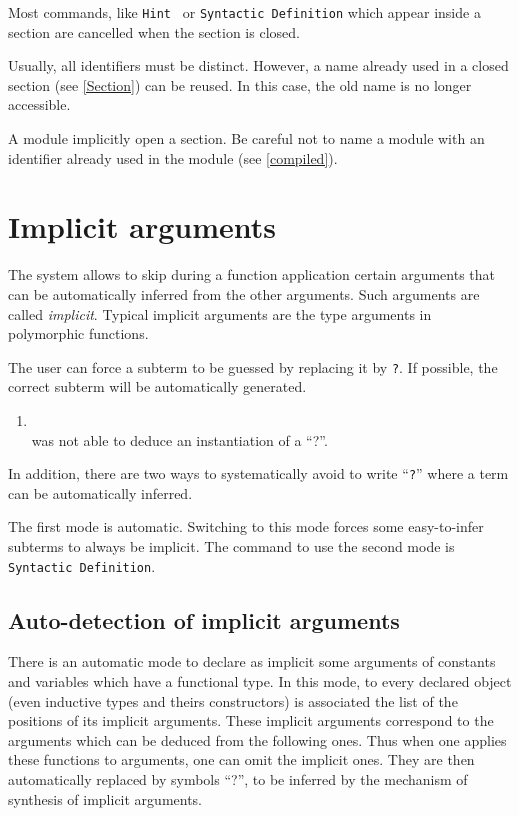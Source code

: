 \begin{Remarks}
\item Most commands, like {\tt Hint \ident} or {\tt Syntactic
  Definition} which appear inside a section are cancelled when the
section is closed.
\item Usually, all identifiers must be distinct. 
However, a name already used in a closed section (see \ref{Section})
can be reused. In this case, the old name is no longer accessible.
\item A module implicitly open a section. Be careful not to name a
module with an identifier already used in the module (see \ref{compiled}).
\end{Remarks}

\section{Implicit arguments}

The {\Coq} system allows to skip during a function application certain
arguments that can be automatically inferred from the other
arguments. Such arguments are called {\em implicit}. Typical implicit
arguments are the type arguments in polymorphic functions.

The user can force a subterm to be guessed by replacing it by
{\tt ?}. If possible, the correct subterm will be automatically generated.

\ErrMsg
\begin{enumerate}
\item {} \\
  {\Coq} was not able to deduce an instantiation of a ``?''.
\end{enumerate}

In addition, there are two ways to systematically avoid to write
``{\tt ?}'' where a term can be automatically inferred.

The first mode is automatic. Switching to this mode forces some
easy-to-infer subterms to always be implicit.
The command to use the second mode is  {\tt Syntactic
Definition}.

\subsection{Auto-detection of implicit arguments}
\label{Auto-implicit}

There is an automatic mode to declare as implicit some arguments of
constants and variables which have a functional type. In this mode,
to every declared object (even inductive types and theirs constructors) is
associated the list of the positions of its implicit arguments. These
implicit arguments correspond to the arguments which can be deduced
from the following ones. Thus when one applies these functions to
arguments, one can omit the implicit ones. They are then automatically
replaced by symbols ``?'', to be inferred by the mechanism of
synthesis of implicit arguments.

